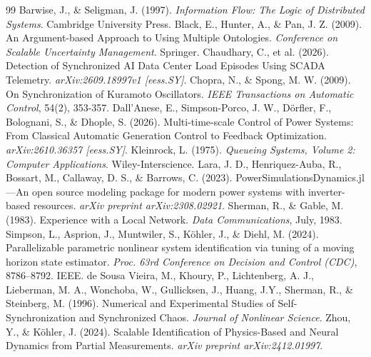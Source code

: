 \documentclass[11pt,fleqn]{article}
\begin{document}
\begin{thebibliography}{99}
 Barwise, J., \& Seligman, J. (1997). \textit{Information Flow: The Logic of Distributed Systems}. Cambridge University Press.
 Black, E., Hunter, A., \& Pan, J. Z. (2009). An Argument-based Approach to Using Multiple Ontologies. \textit{Conference on Scalable Uncertainty Management}. Springer.
 Chaudhary, C., et al. (2026). Detection of Synchronized AI Data Center Load Episodes Using SCADA Telemetry. \textit{arXiv:2609.18997v1 [eess.SY]}.
 Chopra, N., \& Spong, M. W. (2009). On Synchronization of Kuramoto Oscillators. \textit{IEEE Transactions on Automatic Control}, 54(2), 353-357.
 Dall'Anese, E., Simpson-Porco, J. W., Dörfler, F., Bolognani, S., \& Dhople, S. (2026). Multi-time-scale Control of Power Systems: From Classical Automatic Generation Control to Feedback Optimization. \textit{arXiv:2610.36357 [eess.SY]}.
 Kleinrock, L. (1975). \textit{Queueing Systems, Volume 2: Computer Applications}. Wiley-Interscience.
 Lara, J. D., Henriquez-Auba, R., Bossart, M., Callaway, D. S., \& Barrows, C. (2023). PowerSimulationsDynamics.jl---An open source modeling package for modern power systems with inverter-based resources. \textit{arXiv preprint arXiv:2308.02921}.
 Sherman, R., \& Gable, M. (1983). Experience with a Local Network. \textit{Data Communications}, July, 1983.
 Simpson, L., Asprion, J., Muntwiler, S., Köhler, J., \& Diehl, M. (2024). Parallelizable parametric nonlinear system identification via tuning of a moving horizon state estimator. \textit{Proc. 63rd Conference on Decision and Control (CDC)}, 8786–8792. IEEE.
 de Sousa Vieira, M., Khoury, P., Lichtenberg, A. J., Lieberman, M. A., Wonchoba, W., Gullicksen, J., Huang, J.Y., Sherman, R., \& Steinberg, M. (1996). Numerical and Experimental Studies of Self-Synchronization and Synchronized Chaos. \textit{Journal of Nonlinear Science}.
 Zhou, Y., \& Köhler, J. (2024). Scalable Identification of Physics-Based and Neural Dynamics from Partial Measurements. \textit{arXiv preprint arXiv:2412.01997}.
\end{thebibliography}
\end{document}
